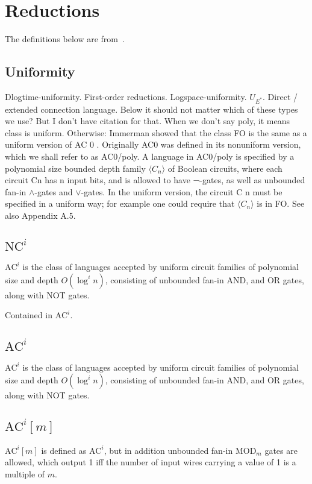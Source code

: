 \chapter{Reductions}
\label{chap:reductions}
The definitions below are from~\cite{10.5555/520668}.


\section{Uniformity}
Dlogtime-uniformity. First-order reductions. Logspace-uniformity. $U_{E^*}$. Direct / extended connection language.
Below it should not matter which of these types we use? But I don't have citation for that.
When we don't say poly, it means class is uniform. Otherwise: Immerman showed that the class FO is the same as a uniform version
of AC 0 . Originally AC0 was defined in its nonuniform version, which
we shall refer to as AC0/poly. A language in AC0/poly is specified by
a polynomial size bounded depth family $\langle C_n \rangle$ of Boolean circuits, where
each circuit Cn has n input bits, and is allowed to have ¬-gates, as well as
unbounded fan-in $\land$-gates and $\lor$-gates. In the uniform version, the circuit
C n must be specified in a uniform way; for example one could require that
$\langle C_n \rangle$ is in FO. See also Appendix A.5.


\section{\texorpdfstring{$\text{NC}^i$}{NC\string^i}}
$\text{AC}^i$ is the class of languages accepted by uniform circuit
families of polynomial size and depth $O(\log^i n)$, consisting of unbounded fan-in
AND, and OR gates, along with NOT gates.

Contained in $\text{AC}^i$.

\section{\texorpdfstring{$\text{AC}^i$}{AC\string^i}}
$\text{AC}^i$ is the class of languages accepted by uniform circuit
families of polynomial size and depth $O(\log^i n)$, consisting of unbounded fan-in
AND, and OR gates, along with NOT gates.

\section{\texorpdfstring{$\text{AC}^i[m]$}{AC\string^i[m]}}
$\text{AC}^i[m]$ is defined as $\text{AC}^i$, but in addition unbounded fan-in $\text{MOD}_m$ gates
are allowed, which output 1 iff the number of input wires carrying a value of 1 is a
multiple of $m$.

